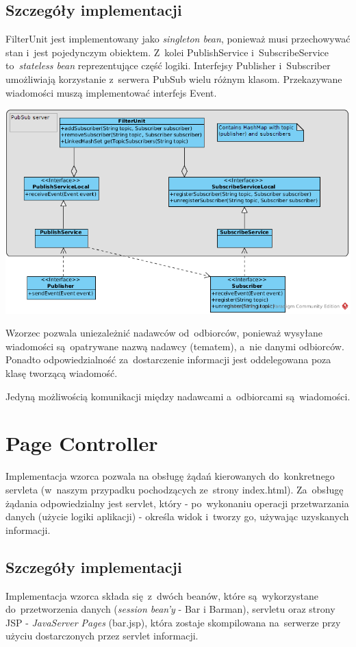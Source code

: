 \documentclass[11pt]{aghdpl}
\begin{document}
\subsection{Szczegóły implementacji}
FilterUnit jest implementowany jako \textit{singleton bean}, ponieważ musi przechowywać stan i~jest pojedynczym obiektem. Z~kolei PublishService i~SubscribeService to~\textit{stateless bean} reprezentujące część logiki. Interfejsy Publisher i~Subscriber umożliwiają korzystanie z~serwera PubSub wielu różnym klasom. Przekazywane wiadomości muszą implementować interfejs Event.

\begin{center}
 \includegraphics[width=14cm]{pubsub}
\end{center}

Wzorzec pozwala uniezależnić nadawców od~odbiorców, ponieważ wysyłane wiadomości są~opatrywane nazwą nadawcy (tematem), a~nie danymi odbiorców. Ponadto odpowiedzialność za~dostarczenie informacji jest oddelegowana poza klasę tworzącą wiadomość. 

Jedyną możliwością komunikacji między nadawcami a~odbiorcami są~wiadomości.

\section{Page Controller}
Implementacja wzorca pozwala na obsługę żądań kierowanych do~konkretnego servleta (w~naszym przypadku pochodzących ze~strony index.html). Za~obsługę żądania odpowiedzialny jest servlet, który - po~wykonaniu operacji przetwarzania danych (użycie logiki aplikacji) - określa widok i~tworzy go, używając uzyskanych informacji.

\subsection{Szczegóły implementacji}
Implementacja wzorca składa się~z~dwóch beanów, które są~wykorzystane do~przetworzenia danych (\textit{session bean'y} - Bar i Barman), servletu oraz strony JSP - \textit{JavaServer Pages} (bar.jsp), która zostaje skompilowana na~serwerze przy użyciu dostarczonych przez servlet informacji.
\end{document}
